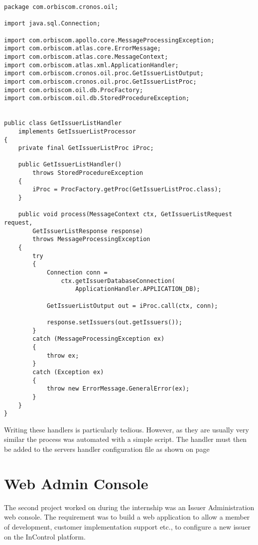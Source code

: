 \documentclass[a4paper, 11pt, titlepage]{article}
\begin{document}
\begin{verbatim} 
package com.orbiscom.cronos.oil; 
 
import java.sql.Connection; 
 
import com.orbiscom.apollo.core.MessageProcessingException; 
import com.orbiscom.atlas.core.ErrorMessage; 
import com.orbiscom.atlas.core.MessageContext; 
import com.orbiscom.atlas.xml.ApplicationHandler; 
import com.orbiscom.cronos.oil.proc.GetIssuerListOutput; 
import com.orbiscom.cronos.oil.proc.GetIssuerListProc; 
import com.orbiscom.oil.db.ProcFactory; 
import com.orbiscom.oil.db.StoredProcedureException; 
 
 
public class GetIssuerListHandler 
    implements GetIssuerListProcessor 
{ 
    private final GetIssuerListProc iProc; 
 
    public GetIssuerListHandler() 
        throws StoredProcedureException 
    { 
        iProc = ProcFactory.getProc(GetIssuerListProc.class); 
    } 
 
    public void process(MessageContext ctx, GetIssuerListRequest request,
        GetIssuerListResponse response) 
        throws MessageProcessingException 
    { 
        try 
        { 
            Connection conn = 
                ctx.getIssuerDatabaseConnection(
                    ApplicationHandler.APPLICATION_DB); 
 
            GetIssuerListOutput out = iProc.call(ctx, conn); 
 
            response.setIssuers(out.getIssuers()); 
        } 
        catch (MessageProcessingException ex) 
        { 
            throw ex; 
        } 
        catch (Exception ex) 
        { 
            throw new ErrorMessage.GeneralError(ex); 
        } 
    } 
} 
\end{verbatim} 
Writing these handlers is particularly tedious. However, as they are usually very similar the process was automated with a simple script. 
The handler must then be added to the servers handler configuration file as shown on page \pageref{handlerset} 
 
\cite{OIL} 
 
\section{Web Admin Console} 
The second project worked on during the internship was an Issuer Administration web console. The requirement was to build a web application to allow a member of development, customer implementation support etc., to configure a new issuer on the InControl platform. 
 
\end{document}
